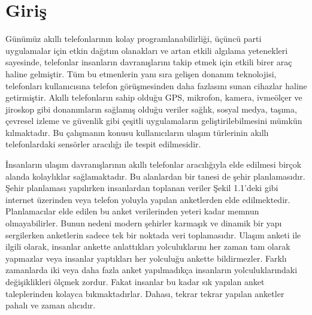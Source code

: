 \chapter{Giriş}

Günümüz akıllı telefonlarının kolay programlanabilirliği, üçüncü parti uygulamalar için etkin dağıtım olanakları ve artan etkili algılama yetenekleri sayesinde, telefonlar insanların davranışlarını takip etmek için etkili birer araç haline gelmiştir. Tüm bu etmenlerin yanı sıra gelişen donanım teknolojisi, telefonları kullanıcısına telefon görüşmesinden daha fazlasını sunan cihazlar haline getirmiştir. Akıllı telefonların sahip olduğu GPS, mikrofon, kamera, ivmeölçer ve jiroskop gibi donanımların sağlamış olduğu veriler sağlık, sosyal medya, taşıma, çevresel izleme ve güvenlik gibi çeşitli uygulamaların geliştirilebilmesini mümkün kılmaktadır. Bu çalışmanın konusu kullanıcıların ulaşım türlerinin akıllı telefonlardaki sensörler aracılığı ile tespit edilmesidir.

İnsanların ulaşım davranışlarının akıllı telefonlar aracılığıyla elde edilmesi birçok alanda kolaylıklar sağlamaktadır. Bu alanlardan bir tanesi de şehir planlamasıdır. Şehir planlaması yapılırken insanlardan toplanan veriler Şekil 1.1'deki gibi internet üzerinden veya telefon yoluyla yapılan anketlerden elde edilmektedir. Planlamacılar elde edilen bu anket verilerinden yeteri kadar memnun olmayabilirler. Bunun nedeni modern şehirler karmaşık ve dinamik bir yapı sergilerken anketlerin sadece tek bir noktada veri toplamasıdır. Ulaşım anketi ile ilgili olarak, insanlar ankette anlattıkları yolculuklarını her zaman tam olarak yapmazlar veya insanlar yaptıkları her yolculuğu ankette bildirmezler. Farklı zamanlarda iki veya daha fazla anket yapılmadıkça insanların yolculuklarındaki değişiklikleri ölçmek zordur. Fakat insanlar bu kadar sık yapılan anket taleplerinden kolayca bıkmaktadırlar. Dahası, tekrar tekrar yapılan anketler pahalı ve zaman alıcıdır.

